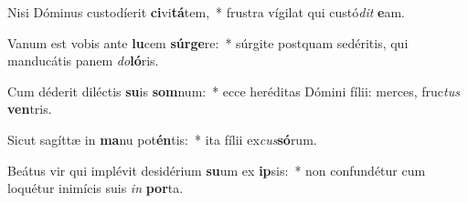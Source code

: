 \item Nisi Dóminus custodíerit \textbf{ci}vi\textbf{tá}tem,~* frustra vígilat qui custó\textit{dit} \textbf{e}am.
\item Vanum est vobis ante \textbf{lu}cem \textbf{súr}\textbf{ge}re:~* súrgite postquam sedéritis, qui manducátis panem \textit{do}\textbf{ló}ris.
\item Cum déderit diléctis \textbf{su}is \textbf{som}num:~* ecce heréditas Dómini fílii: merces, fruc\textit{tus} \textbf{ven}tris.
\item Sicut sagíttæ in \textbf{ma}nu pot\textbf{én}tis:~* ita fílii ex\textit{cus}\textbf{só}rum.
\item Beátus vir qui implévit desidérium \textbf{su}um ex \textbf{ip}sis:~* non confundétur cum loquétur inimícis suis \textit{in} \textbf{por}ta.
